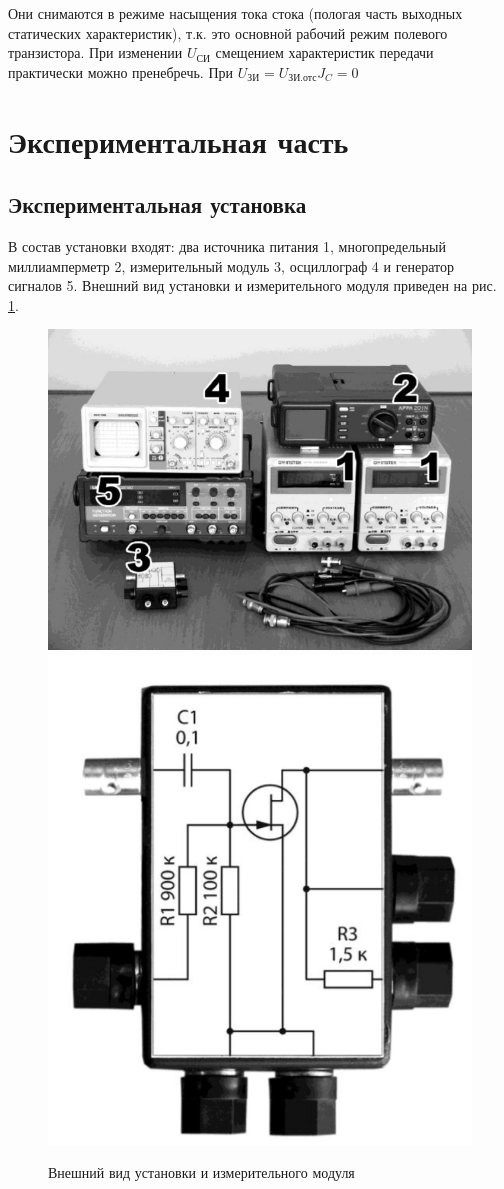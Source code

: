 Они снимаются в режиме насыщения тока стока (пологая часть выходных статических характеристик), т.к. это основной рабочий режим полевого транзистора. При изменении $U_\text{СИ}$ смещением характеристик передачи практически можно пренебречь. При $U_\text{ЗИ} = U_\text{ЗИ.отс} J_C=0$

\newpage
\section{Экспериментальная часть}
\subsection{Экспериментальная установка}
В состав установки входят: два источника питания 1, многопредельный миллиамперметр 2, измерительный модуль 3,
осциллограф 4 и генератор сигналов 5. Внешний вид установки и измерительного модуля приведен на рис. \ref{fig:5}. 
\begin{figure}[h!]
	\centering
	\includegraphics[width=0.5\linewidth]{imgs/setup.png}
	\includegraphics[width=0.35\linewidth]{imgs/scheme.png}
	\caption{Внешний вид установки и измерительного модуля}
	\label{fig:5}
\end{figure}

